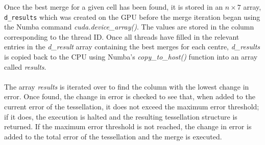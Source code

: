 Once the best merge for a given cell has been found, it is stored in an $n \times 7$ array, \texttt{d\_results} which was created on the GPU before the merge iteration began using the Numba command \textit{cuda.device\_array()}. The values are stored in the column corresponding to the thread ID. Once all threads have filled in the relevant entries in the \textit{d\_result} array containing the best merges for each centre, \textit{d\_results} is copied back to the CPU using Numba's \textit{copy\_to\_host()} function into an array called \textit{results}.
\\
\\
The array \textit{results} is iterated over to find the column with the lowest change in error. Once found, the change in error is checked to see that, when added to the current error of the tessellation, it does not exceed the maximum error threshold; if it does, the execution is halted and the resulting tessellation structure is returned. If the maximum error threshold is not reached, the change in error is added to the total error of the tessellation and the merge is executed.